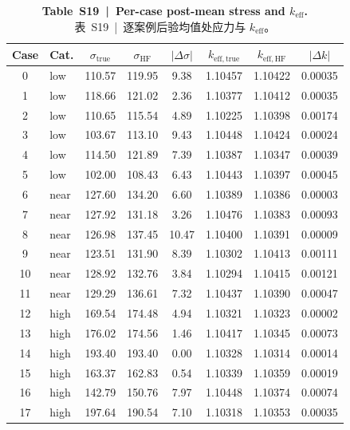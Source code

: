\documentclass[11pt,a4paper]{article}
\newcommand{\keff}{\ensuremath{k_{\mathrm{eff}}}}
\begin{document}
\begin{table}[htbp]
\centering
\caption{\textbf{Table~S19~|~Per-case post-mean stress and \keff{}.}\\
\small 表~S19~|~逐案例后验均值处应力与 \keff{}。}
\label{tab:S19}
\smallskip\small
\begin{tabular}{clcccccc}
\toprule
Case & Cat. & $\sigma_{\mathrm{true}}$ & $\sigma_{\mathrm{HF}}$ & $|\Delta\sigma|$ & $k_{\mathrm{eff,true}}$ & $k_{\mathrm{eff,HF}}$ & $|\Delta k|$ \\
\midrule
 0 & low  & 110.57 & 119.95 &  9.38 & 1.10457 & 1.10422 & 0.00035 \\
 1 & low  & 118.66 & 121.02 &  2.36 & 1.10377 & 1.10412 & 0.00035 \\
 2 & low  & 110.65 & 115.54 &  4.89 & 1.10225 & 1.10398 & 0.00174 \\
 3 & low  & 103.67 & 113.10 &  9.43 & 1.10448 & 1.10424 & 0.00024 \\
 4 & low  & 114.50 & 121.89 &  7.39 & 1.10387 & 1.10347 & 0.00039 \\
 5 & low  & 102.00 & 108.43 &  6.43 & 1.10443 & 1.10397 & 0.00045 \\
 6 & near & 127.60 & 134.20 &  6.60 & 1.10389 & 1.10386 & 0.00003 \\
 7 & near & 127.92 & 131.18 &  3.26 & 1.10476 & 1.10383 & 0.00093 \\
 8 & near & 126.98 & 137.45 & 10.47 & 1.10400 & 1.10391 & 0.00009 \\
 9 & near & 123.51 & 131.90 &  8.39 & 1.10302 & 1.10413 & 0.00111 \\
10 & near & 128.92 & 132.76 &  3.84 & 1.10294 & 1.10415 & 0.00121 \\
11 & near & 129.29 & 136.61 &  7.32 & 1.10437 & 1.10390 & 0.00047 \\
12 & high & 169.54 & 174.48 &  4.94 & 1.10321 & 1.10323 & 0.00002 \\
13 & high & 176.02 & 174.56 &  1.46 & 1.10417 & 1.10345 & 0.00073 \\
14 & high & 193.40 & 193.40 &  0.00 & 1.10328 & 1.10314 & 0.00014 \\
15 & high & 163.37 & 162.83 &  0.54 & 1.10339 & 1.10359 & 0.00019 \\
16 & high & 142.79 & 150.76 &  7.97 & 1.10448 & 1.10374 & 0.00074 \\
17 & high & 197.64 & 190.54 &  7.10 & 1.10318 & 1.10353 & 0.00035 \\
\bottomrule
\end{tabular}
\end{table}
\end{document}
